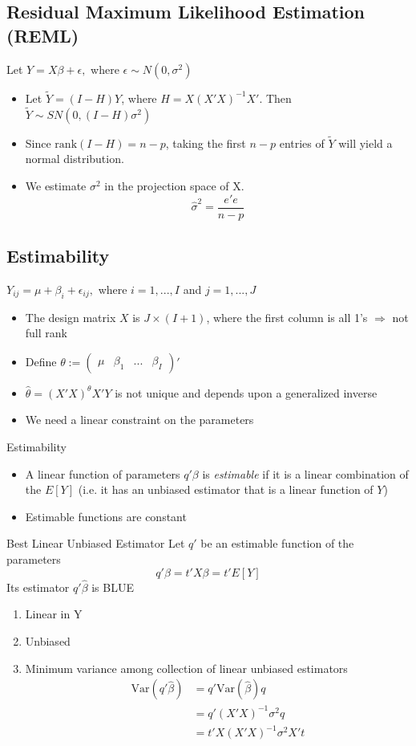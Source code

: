 \documentclass[12pt]{article}\usepackage{graphicx, color}
\theoremstyle{definition}
\newcommand{\Var}{\mathrm{Var}}
\newcommand{\rank}{\mathrm{rank}}
\renewcommand{\tilde}{\widetilde}
\renewcommand{\hat}{\widehat}
\begin{document}
\subsection{Residual Maximum Likelihood Estimation (REML)}
Let $Y=X\beta+\epsilon,$ where $\epsilon \sim N(0, \sigma^2)$
\begin{itemize}
\item Let $\tilde Y= (I-H)Y$, where $H=X(X'X)^{-1}X'$. Then $\tilde Y \sim SN(0, (I-H)\sigma^2)$
\item Since $\rank(I-H)=n-p$, taking the first $n-p$ entries of $\tilde Y$ will yield a normal distribution. 
\item We estimate $\sigma^2$ in the projection space of X. 
$$\hat \sigma^2 =\frac{e'e}{n-p}$$
\end{itemize}
\subsection{Estimability}
$Y_{ij}=\mu +\beta_i+\epsilon_{ij},$ where $i=1,...,I$ and $j=1, ..., J$
\begin{itemize}
\item The design matrix $X$ is $J\times (I+1)$, where the first column is all 1's $\Rightarrow$ not full rank
\item Define $\theta:=\begin{pmatrix}\mu&\beta_1&...&\beta_I\end{pmatrix}'$
\item $\hat \theta = (X'X)^\theta X'Y$ is not unique and depends upon a generalized inverse 
\item We need a linear constraint on the parameters
\end{itemize}
Estimability
\begin{itemize}
\item A linear function of parameters $q'\beta$ is \emph{estimable} if it is a linear combination of the $E[Y]$ (i.e. it has an unbiased estimator that is a linear function of $Y$)
\item Estimable functions are constant
\end{itemize}
Best Linear Unbiased Estimator
 Let $q'$ be an estimable function of the parameters
$$q'\beta=t'X\beta=t'E[Y]$$
Its estimator $q'\hat \beta$ is BLUE
\begin{enumerate}
\item Linear in Y
\item Unbiased
\item Minimum variance among collection of linear unbiased estimators
\begin{align*}\Var(q'\hat \beta)&=q'\Var(\hat \beta)q\\
&=q'(X'X)^{-1}\sigma^2q\\
&=t'X(X'X)^{-1}\sigma^2X't\\
\end{align*}
\end{enumerate}
\end{document}
